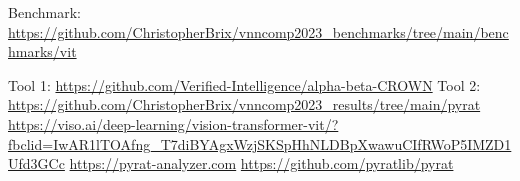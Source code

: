 \documentclass[runningheads]{llncs}
\begin{document}
\newpage
\begin{thebibliography}{9}
\bibitem{}
Benchmark: \url{https://github.com/ChristopherBrix/vnncomp2023_benchmarks/tree/main/benchmarks/vit}

\bibitem{}
Tool 1: \url{https://github.com/Verified-Intelligence/alpha-beta-CROWN}
\bibitem{}
Tool 2: \url{https://github.com/ChristopherBrix/vnncomp2023_results/tree/main/pyrat}
\bibitem{}
\url{https://viso.ai/deep-learning/vision-transformer-vit/?fbclid=IwAR1lTOAfng_T7diBYAgxWzjSKSpHhNLDBpXwawuCIfRWoP5IMZD1Ufd3GCc}
\bibitem{}
\url{https://pyrat-analyzer.com}
\bibitem{}
\url{https://github.com/pyratlib/pyrat}



\end{thebibliography}
\end{document}
